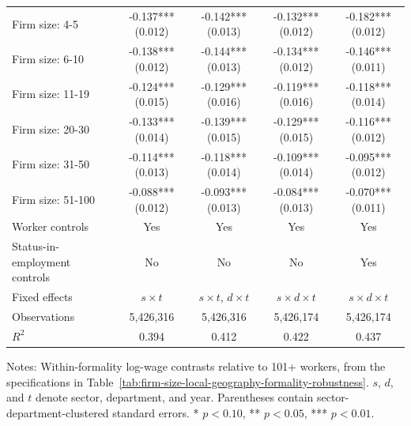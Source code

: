 \begin{table}[htbp]
\begin{tabular}{lcccc}
    Firm size: 4-5 & -0.137*** {\scriptsize (0.012)} & -0.142*** {\scriptsize (0.013)} & -0.132*** {\scriptsize (0.012)} & -0.182*** {\scriptsize (0.012)} \\
    Firm size: 6-10 & -0.138*** {\scriptsize (0.012)} & -0.144*** {\scriptsize (0.013)} & -0.134*** {\scriptsize (0.012)} & -0.146*** {\scriptsize (0.011)} \\
    Firm size: 11-19 & -0.124*** {\scriptsize (0.015)} & -0.129*** {\scriptsize (0.016)} & -0.119*** {\scriptsize (0.016)} & -0.118*** {\scriptsize (0.014)} \\
    Firm size: 20-30 & -0.133*** {\scriptsize (0.014)} & -0.139*** {\scriptsize (0.015)} & -0.129*** {\scriptsize (0.015)} & -0.116*** {\scriptsize (0.012)} \\
    Firm size: 31-50 & -0.114*** {\scriptsize (0.013)} & -0.118*** {\scriptsize (0.014)} & -0.109*** {\scriptsize (0.014)} & -0.095*** {\scriptsize (0.012)} \\
    Firm size: 51-100 & -0.088*** {\scriptsize (0.012)} & -0.093*** {\scriptsize (0.013)} & -0.084*** {\scriptsize (0.013)} & -0.070*** {\scriptsize (0.011)} \\
    \midrule
    Worker controls & Yes & Yes & Yes & Yes \\
    Status-in-employment controls & No & No & No & Yes \\
    Fixed effects & $s\times t$ & $s\times t$, $d\times t$ & $s\times d\times t$ & $s\times d\times t$ \\
    Observations & 5,426,316 & 5,426,316 & 5,426,174 & 5,426,174 \\
    $R^2$ & 0.394 & 0.412 & 0.422 & 0.437 \\
    \bottomrule
  \end{tabular}
  \vspace{0.3em}
  \begin{minipage}{0.95\textwidth}
  \footnotesize
  Notes: Within-formality log-wage contrasts relative to 101+ workers, from the specifications in Table~\ref{tab:firm-size-local-geography-formality-robustness}. $s$, $d$, and $t$ denote sector, department, and year. Parentheses contain sector-department-clustered standard errors. * $p<0.10$, ** $p<0.05$, *** $p<0.01$.
  \end{minipage}
\end{table}
